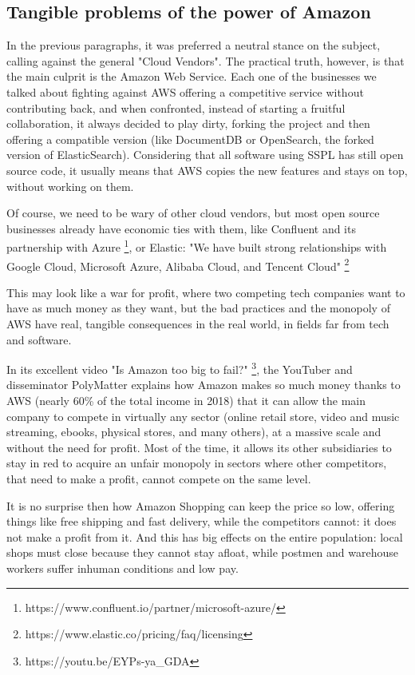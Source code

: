 \documentclass[12pt, a4paper]{article}
\begin{document}
  \pagebreak
  \subsection{Tangible problems of the power of Amazon}
  In the previous paragraphs, it was preferred a neutral stance on the subject, calling against the general "Cloud Vendors". The practical truth, however, is that the main culprit is the Amazon Web Service. Each one of the businesses we talked about fighting against AWS offering a competitive service without contributing back, and when confronted, instead of starting a fruitful collaboration, it always decided to play dirty, forking the project and then offering a compatible version (like DocumentDB or OpenSearch, the forked version of ElasticSearch). Considering that all software using SSPL has still open source code, it usually means that AWS copies the new features and stays on top, without working on them.

  Of course, we need to be wary of other cloud vendors, but most open source businesses already have economic ties with them, like Confluent and its partnership with Azure \footnote{https://www.confluent.io/partner/microsoft-azure/}, or Elastic: "We have built strong relationships with Google Cloud, Microsoft Azure, Alibaba Cloud, and Tencent Cloud" \footnote{https://www.elastic.co/pricing/faq/licensing}
  
  This may look like a war for profit, where two competing tech companies want to have as much money as they want, but the bad practices and the monopoly of AWS have real, tangible consequences in the real world, in fields far from tech and software. 

  In its excellent video "Is Amazon too big to fail?" \footnote{https://youtu.be/EYPs-ya\_GDA}, the YouTuber and disseminator PolyMatter explains how Amazon makes so much money thanks to AWS (nearly 60\% of the total income in 2018) that it can allow the main company to compete in virtually any sector (online retail store, video and music streaming, ebooks, physical stores, and many others), at a massive scale and without the need for profit. Most of the time, it allows its other subsidiaries to stay in red to acquire an unfair monopoly in sectors where other competitors, that need to make a profit, cannot compete on the same level.

  It is no surprise then how Amazon Shopping can keep the price so low, offering things like free shipping and fast delivery, while the competitors cannot: it does not make a profit from it. And this has big effects on the entire population: local shops must close because they cannot stay afloat, while postmen and warehouse workers suffer inhuman conditions and low pay. 
\end{document}

